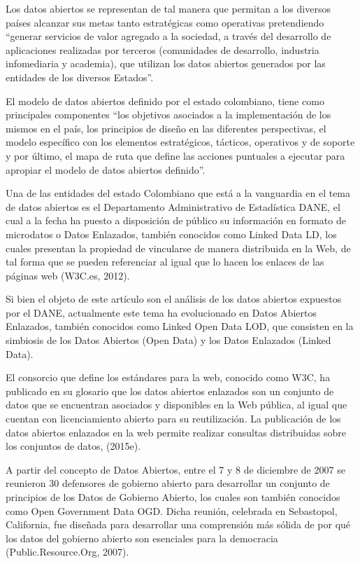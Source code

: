 Los datos abiertos se representan de tal manera que permitan a los diversos países alcanzar sus metas tanto estratégicas como operativas pretendiendo “generar servicios de valor agregado a la sociedad, a través del desarrollo de aplicaciones realizadas por terceros (comunidades de desarrollo, industria infomediaria y academia), que utilizan los datos abiertos generados por las entidades de los diversos Estados”. 

El modelo de datos abiertos definido por el estado colombiano, tiene como principales componentes “los objetivos asociados a la implementación de los mismos en el país,  los principios de diseño en las  diferentes  perspectivas, el  modelo específico  con  los elementos  estratégicos,  tácticos,  operativos  y  de  soporte  y por último, el  mapa  de  ruta que  define  las  acciones  puntuales  a ejecutar para apropiar el modelo de datos abiertos definido”.

Una de las entidades del estado Colombiano que está a la vanguardia en el tema de datos abiertos es el Departamento Administrativo de Estadística DANE, el cual a la fecha ha puesto a disposición de público su información en formato de microdatos o Datos Enlazados, también conocidos como Linked Data LD, los cuales presentan la propiedad de vincularse de manera distribuida en la Web, de tal forma que se pueden referenciar al igual que lo hacen los enlaces de las páginas web (W3C.es, 2012).

Si bien el objeto de este artículo son el análisis de los datos abiertos expuestos por el DANE, actualmente este tema ha evolucionado en Datos Abiertos Enlazados, también conocidos como Linked Open Data LOD, que consisten en la simbiosis de los Datos Abiertos (Open Data) y los Datos Enlazados (Linked Data). 

El consorcio que define los estándares para la web, conocido como W3C, ha publicado en su glosario que los datos abiertos enlazados son un conjunto de datos que se encuentran asociados y disponibles en la Web pública, al igual que cuentan con licenciamiento abierto para su reutilización. La publicación de los datos abiertos enlazados en la web permite realizar consultas distribuidas sobre los conjuntos de datos, (2015e).

A partir del concepto de Datos Abiertos, entre el 7 y 8 de diciembre de 2007 se reunieron 30 defensores de gobierno abierto para desarrollar un conjunto de principios de los Datos de Gobierno Abierto, los cuales son también conocidos como Open Government Data OGD. Dicha reunión, celebrada en Sebastopol, California, fue diseñada para desarrollar una comprensión más sólida de por qué los datos del gobierno abierto son esenciales para la democracia (Public.Resource.Org, 2007).

